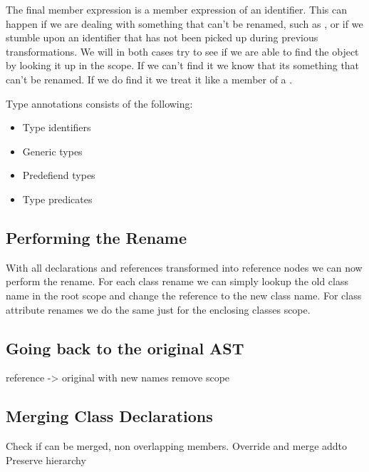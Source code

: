 The final member expression is a member expression of an identifier.
This can happen if we are dealing with something that can't be renamed, such as , or if we stumble upon an identifier that has not been picked up during previous transformations.
We will in both cases try to see if we are able to find the object by looking it up in the scope.
If we can't find it we know that its something that can't be renamed.
If we do find it we treat it like a member of a .

Type annotations consists of the following:

\begin{itemize}
    \item Type identifiers
    \item Generic types
    \item Predefiend types
    \item Type predicates
\end{itemize}


\subsection{Performing the Rename}\label{subsec:performing-the-rename}

With all declarations and references transformed into reference nodes we can now perform the rename.
For each class rename we can simply lookup the old class name in the root scope and change the reference to the new class name.
For class attribute renames we do the same just for the enclosing classes scope.

\subsection{Going back to the original AST}\label{subsec:going-back-to-the-original-ast}

reference -> original with new names
remove scope

\subsection{Merging Class Declarations}\label{subsec:merging-class-declarations}

Check if can be merged, non overlapping members.
Override and merge addto
Preserve hierarchy
